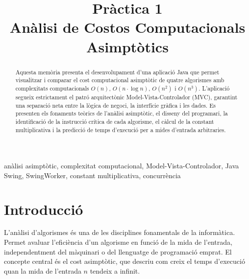 \documentclass[conference,compsoc]{IEEEtran}
\begin{document}
\title{Pràctica 1 \\ Anàlisi de Costos Computacionals Asimptòtics}

\author{
}

\maketitle

\begin{strip}
\begin{abstract}
Aquesta memòria presenta el desenvolupament d'una aplicació Java 
que permet visualitzar i comparar el cost computacional asimptòtic de
quatre algorismes amb complexitats computacionals $O(n)$, $O(n \cdot \log n)$, $O(n^2)$
i $O(n^3)$. L'aplicació segueix estrictament el patró arquitectònic
Model-Vista-Controlador (MVC),
garantint una separació neta entre la lògica de negoci, la
interfície gràfica i les dades. Es presenten els fonaments
teòrics de l'anàlisi asimptòtic, el disseny del programari, la
identificació de la instrucció crítica de cada algorisme, el càlcul de la
constant multiplicativa i la predicció de temps d'execució per a mides
d'entrada arbitraries.
\end{abstract}

\begin{IEEEkeywords}
anàlisi asimptòtic, complexitat computacional, Model-Vista-Controlador, Java Swing, SwingWorker, constant multiplicativa, concurrència
\end{IEEEkeywords}
\end{strip}

\IEEEpeerreviewmaketitle

\section{Introducció}
L'anàlisi d'algorismes és una de les disciplines fonamentals
de la informàtica. Permet avaluar l'eficiència d'un algorisme en funció de
la mida de l'entrada, independentment del màquinari o del llenguatge de
programació emprat. El concepte central és el cost asimptòtic, que
descriu com creix el temps d'execució quan la mida de l'entrada $n$ tendeix
a infinit.
\end{document}
